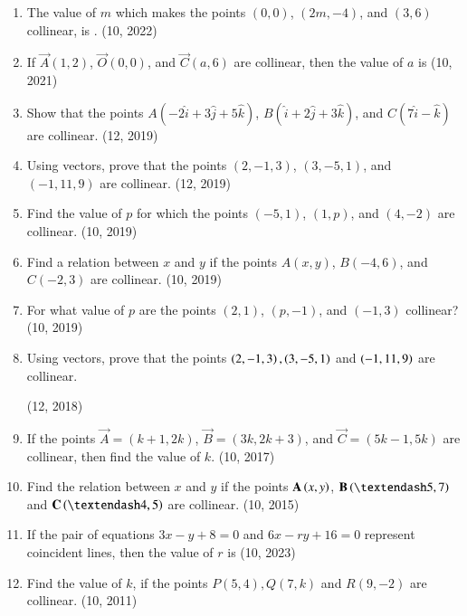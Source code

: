 \begin{enumerate}[label=\thesubsection.\arabic*, ref=\thesubsection.\theenumi]
    \item The value of $m$ which makes the points $(0,0)$, $(2m, -4)$, and $(3,6)$ collinear, is \underline{\hspace{1cm}}.
    \hfill (10, 2022)
		\item If $\vec{A}(1, 2)$, $\vec{O}(0, 0)$, and $\vec{C}(a, 6)$ are collinear, then the value of $a$ is
		\hfill (10, 2021)
	\item Show that the points $A(-2\hat{i} + 3\hat{j} + 5\hat{k})$, $B(\hat{i} + 2\hat{j} + 3\hat{k})$, and $C(7\hat{i} - \hat{k})$ are collinear. \hfill (12, 2019)
	\item Using vectors, prove that the points $(2, -1, 3)$, $(3, -5, 1)$, and $(-1, 11, 9)$ are collinear. \hfill (12, 2019)
\item Find the value of $p$ for which the points $(-5, 1)$, $(1, p)$, and $(4, -2)$ are collinear. \hfill (10, 2019)
\item Find a relation between $x$ and $y$ if the points $A(x, y)$, $B(-4, 6)$, and $C(-2, 3)$ are collinear. \hfill (10, 2019)
\item For what value of $p$ are the points $(2, 1)$, $(p, -1)$, and $(-1, 3)$ collinear? \hfill (10, 2019)
\item Using vectors, prove that the points $\left(2,-1,3\right),\left(3,-5,1\right)$ and $\left(-1,11,9\right)$ are collinear.

\hfill (12, 2018) 
\item If the points $\vec{A} = (k+1, 2k)$, $\vec{B} = (3k, 2k + 3)$, and $\vec{C} = (5k-1, 5k)$ are collinear, then find the value of $k$. \hfill (10, 2017)
\item Find the relation between $x$ and $y$ if the points $\mathbf{A}\left(x,y\right)$, $\vec{B}\brak{–5,7}$ and $\vec{C}\brak{–4, 5}$ are collinear. \hfill (10, 2015)
  \item If the pair of equations $3x-y+8=0$ and $6x-ry+16=0$ represent coincident lines, then the value of $r$ is
     \hfill (10, 2023)
    \item Find the value of $k$, if the points $P(5,4),Q(7,k)$ and $R(9,-2)$ are collinear.
\hfill (10, 2011)
\end{enumerate}
